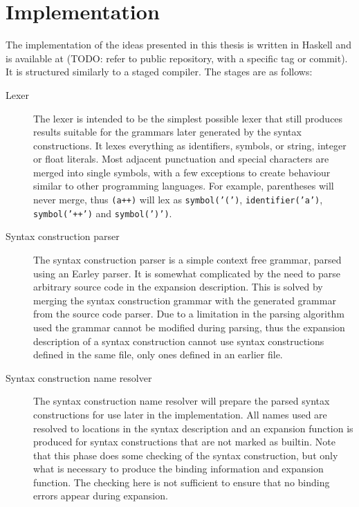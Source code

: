 \documentclass{kththesis}
\begin{document}
\chapter{Implementation}

The implementation of the ideas presented in this thesis is written in Haskell and is available at (TODO: refer to public repository, with a specific tag or commit). It is structured similarly to a staged compiler. The stages are as follows:



\begin{description}
  \item[Lexer] The lexer is intended to be the simplest possible lexer that still produces results suitable for the grammars later generated by the syntax constructions. It lexes everything as identifiers, symbols, or string, integer or float literals. Most adjacent punctuation and special characters are merged into single symbols, with a few exceptions to create behaviour similar to other programming languages. For example, parentheses will never merge, thus \texttt{(a++)} will lex as \texttt{symbol('(')}, \texttt{identifier('a')}, \texttt{symbol('++')} and \texttt{symbol(')')}.

  \item[Syntax construction parser] The syntax construction parser is a simple context free grammar, parsed using an Earley parser. It is somewhat complicated by the need to parse arbitrary source code in the expansion description. This is solved by merging the syntax construction grammar with the generated grammar from the source code parser. Due to a limitation in the parsing algorithm used the grammar cannot be modified during parsing, thus the expansion description of a syntax construction cannot use syntax constructions defined in the same file, only ones defined in an earlier file.

  \item[Syntax construction name resolver] The syntax construction name resolver will prepare the parsed syntax constructions for use later in the implementation. All names used are resolved to locations in the syntax description and an expansion function is produced for syntax constructions that are not marked as builtin. Note that this phase does some checking of the syntax construction, but only what is necessary to produce the binding information and expansion function. The checking here is not sufficient to ensure that no binding errors appear during expansion.


\end{description}
\end{document}
